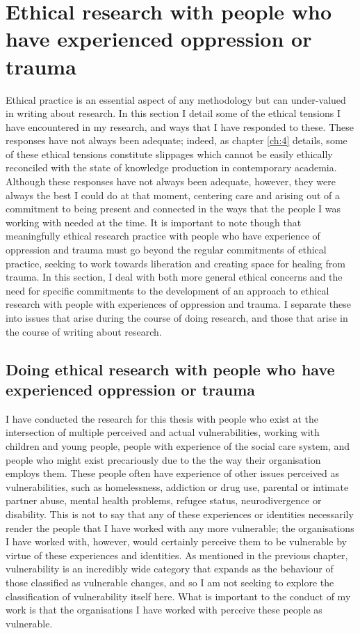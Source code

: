 \section{Ethical research with people who have experienced oppression or trauma}
\label{sec:3-4-ethics}
Ethical practice is an essential aspect of any methodology but can under-valued in writing about research. In this section I detail some of the ethical tensions I have encountered in my research, and ways that I have responded to these. These responses have not always been adequate; indeed, as chapter \ref{ch:4} details, some of these ethical tensions constitute slippages \citep{cutting_making_2021} which cannot be easily ethically reconciled with the state of knowledge production in contemporary academia. Although these responses have not always been adequate, however, they were always the best I could do at that moment, centering care and arising out of a commitment to being present and connected in the ways that the people I was working with needed at the time. It is important to note though that meaningfully ethical research practice with people who have experience of oppression and trauma must go beyond the regular commitments of ethical practice, seeking to work towards liberation and creating space for healing from trauma. In this section, I deal with both more general ethical concerns and the need for specific commitments to the development of an approach to ethical research with people with experiences of oppression and trauma. I separate these into issues that arise during the course of doing research, and those that arise in the course of writing about research. 

\subsection{Doing ethical research with people who have experienced oppression or trauma}
I have conducted the research for this thesis with people who exist at the intersection of multiple perceived and actual vulnerabilities, working with children and young people, people with experience of the social care system, and people who might exist precariously due to the the way their organisation employs them. These people often have experience of other issues perceived as vulnerabilities, such as homelessness,  addiction or drug use, parental or intimate partner abuse, mental health problems, refugee status, neurodivergence or disability. This is not to say that any of these experiences or identities necessarily render the people that I have worked with any more vulnerable; the organisations I have worked with, however, would certainly perceive them to be vulnerable by virtue of these experiences and identities. As mentioned in the previous chapter, vulnerability is an incredibly wide category that expands as the behaviour of those classified as vulnerable changes, and so I am not seeking to explore the classification of vulnerability itself here. What is important to the conduct of my work is that the organisations I have worked with perceive these people as vulnerable. 

